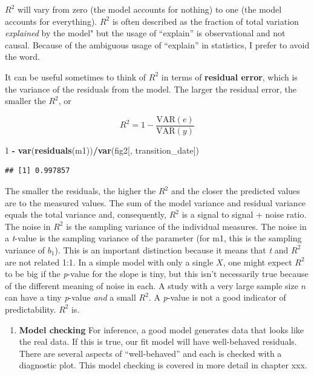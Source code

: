 \documentclass[]{book}
\newenvironment{Shaded}{\begin{snugshade}}{\end{snugshade}}
\newcommand{\DecValTok}[1]{\textcolor[rgb]{0.00,0.00,0.81}{#1}}
\newcommand{\KeywordTok}[1]{\textcolor[rgb]{0.13,0.29,0.53}{\textbf{#1}}}
\newcommand{\NormalTok}[1]{#1}
\newcommand{\OperatorTok}[1]{\textcolor[rgb]{0.81,0.36,0.00}{\textbf{#1}}}
\newcommand{\StringTok}[1]{\textcolor[rgb]{0.31,0.60,0.02}{#1}}
\providecommand{\tightlist}{%
  \setlength{\itemsep}{0pt}\setlength{\parskip}{0pt}}
\begin{document}
\(R^2\) will vary from zero (the model accounts for nothing) to one (the model accounts for everything). \(R^2\) is often described as the fraction of total variation \emph{explained} by the model" but the usage of ``explain'' is observational and not causal. Because of the ambiguous usage of ``explain'' in statistics, I prefer to avoid the word.

It can be useful sometimes to think of \(R^2\) in terms of \textbf{residual error}, which is the variance of the residuals from the model. The larger the residual error, the smaller the \(R^2\), or

\begin{equation}
R^2 = 1 - \frac{\mathrm{VAR}(e)}{\mathrm{VAR}(y)}
\end{equation}

\begin{Shaded}
\begin{Highlighting}[]
\DecValTok{1} \OperatorTok{-}\StringTok{ }\KeywordTok{var}\NormalTok{(}\KeywordTok{residuals}\NormalTok{(m1))}\OperatorTok{/}\KeywordTok{var}\NormalTok{(fig2[, transition_date])}
\end{Highlighting}
\end{Shaded}

\begin{verbatim}
## [1] 0.997857
\end{verbatim}

The smaller the residuals, the higher the \(R^2\) and the closer the predicted values are to the measured values. The sum of the model variance and residual variance equals the total variance and, consequently, \(R^2\) is a signal to signal + noise ratio. The noise in \(R^2\) is the sampling variance of the individual measures. The noise in a \emph{t}-value is the sampling variance of the parameter (for m1, this is the sampling variance of \(b_1\)). This is an important distinction because it means that \emph{t} and \(R^2\) are not related 1:1. In a simple model with only a single \(X\), one might expect \(R^2\) to be big if the \emph{p}-value for the slope is tiny, but this isn't necessarily true because of the different meaning of noise in each. A study with a very large sample size \(n\) can have a tiny \emph{p}-value \emph{and} a small \(R^2\). A \emph{p}-value is not a good indicator of predictability. \(R^2\) is.

\begin{enumerate}
\def\labelenumi{\arabic{enumi}.}
\setcounter{enumi}{1}
\tightlist
\item
  \textbf{Model checking} For inference, a good model generates data that looks like the real data. If this is true, our fit model will have well-behaved residuals. There are several aspects of ``well-behaved'' and each is checked with a diagnostic plot. This model checking is covered in more detail in chapter xxx.
\end{enumerate}
\end{document}
